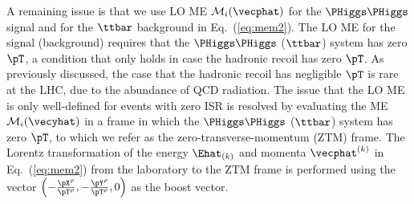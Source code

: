 A remaining issue is that we use LO ME $\mathcal{M}_{i}(\vecphat)$ for the $\PHiggs\PHiggs$ signal and for the $\ttbar$ background in Eq.~(\ref{eq:mem2}).
The LO ME for the signal (background) requires that the $\PHiggs\PHiggs$ ($\ttbar$) system has zero $\pT$, 
a condition that only holds in case the hadronic recoil has zero $\pT$.
As previously discussed, the case that the hadronic recoil has negligible $\pT$ is rare at the LHC, due to the abundance of QCD radiation.
The issue that the LO ME is only well-defined for events with zero ISR
is resolved by evaluating the ME $\mathcal{M}_{i}(\vecyhat)$ in a frame in which the $\PHiggs\PHiggs$ ($\ttbar$) system has zero $\pT$, 
to which we refer as the zero-transverse-momentum (ZTM) frame.
The Lorentz transformation of the energy $\Ehat_{(k)}$ and momenta $\vecphat^{(k)}$ in Eq.~(\ref{eq:mem2})
from the laboratory to the ZTM frame is performed using the vector $\left(-\frac{\pX^{\rho}}{\pT^{\rho}},-\frac{\pY^{\rho}}{\pT^{\rho}},0\right)$ as the boost vector.

